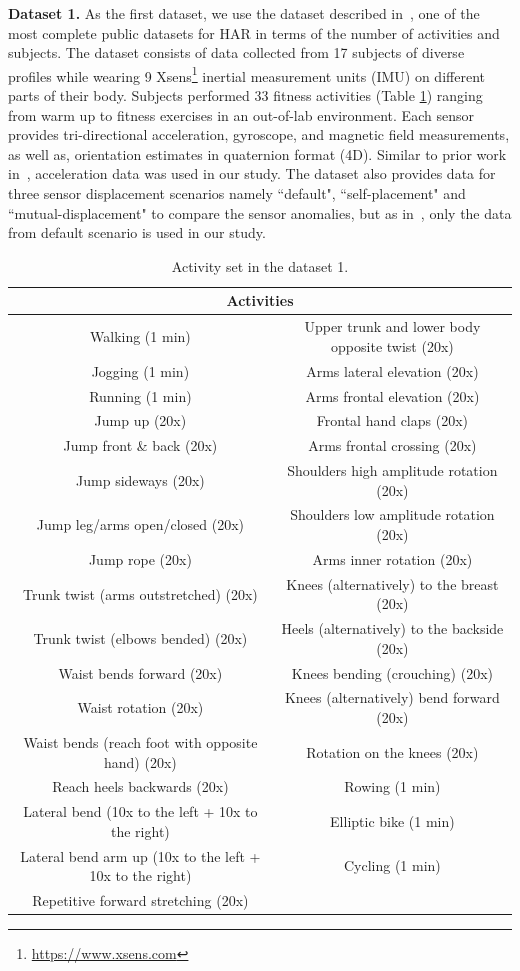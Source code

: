 \documentclass[sensors,article,submit,moreauthors,pdftex]{Definitions/mdpi}
\begin{document}
\noindent\textbf{Dataset 1.} \label{sec:dataset1}
 As the first dataset, we use the dataset described in~\cite{banos2012benchmark}, one of the most complete public datasets for HAR in terms of the number of activities and subjects. The dataset consists of data collected from 17 subjects of diverse profiles while wearing 9 Xsens\footnote{\url{https://www.xsens.com}} inertial measurement units (IMU) on different parts of their body. Subjects performed 33 fitness activities (Table \ref{tab:Activites1}) ranging from warm up to fitness exercises in an out-of-lab environment. Each sensor provides tri-directional acceleration, gyroscope, and magnetic field measurements, as well as, orientation estimates in quaternion format (4D). Similar to prior work in~\cite{banos2014window}, acceleration data was used in our study. The dataset also provides data for three sensor displacement scenarios namely ``default", ``self-placement" and ``mutual-displacement" to compare the sensor anomalies, but as in~\cite{banos2014window}, only the data from default scenario is used in our study. 

\begin{table}
  \centering
\begin{tabular}{|c|c|}
\hline 
\multicolumn{2}{|c|}{Activities}\tabularnewline
\hline 
\hline 
Walking (1 min) & Upper trunk and lower body opposite twist (20x)\tabularnewline
\hline 
Jogging (1 min) & Arms lateral elevation (20x)\tabularnewline
\hline 
Running (1 min) & Arms frontal elevation (20x)\tabularnewline
\hline 
Jump up (20x) & Frontal hand claps (20x)\tabularnewline
\hline 
Jump front \& back (20x) & Arms frontal crossing (20x)\tabularnewline
\hline 
Jump sideways (20x) & Shoulders high amplitude rotation (20x)\tabularnewline
\hline 
Jump leg/arms open/closed (20x) & Shoulders low amplitude rotation (20x)\tabularnewline
\hline 
Jump rope (20x) & Arms inner rotation (20x)\tabularnewline
\hline 
Trunk twist (arms outstretched) (20x) & Knees (alternatively) to the breast (20x)\tabularnewline
\hline 
Trunk twist (elbows bended) (20x) & Heels (alternatively) to the backside (20x)\tabularnewline
\hline 
Waist bends forward (20x) & Knees bending (crouching) (20x)\tabularnewline
\hline 
Waist rotation (20x) & Knees (alternatively) bend forward (20x)\tabularnewline
\hline 
Waist bends (reach foot with opposite hand) (20x) & Rotation on the knees (20x)\tabularnewline
\hline 
Reach heels backwards (20x) & Rowing (1 min)\tabularnewline
\hline 
Lateral bend (10x to the left + 10x to the right) & Elliptic bike (1 min)\tabularnewline
\hline 
Lateral bend arm up (10x to the left + 10x to the right) & Cycling (1 min)\tabularnewline
\hline 
Repetitive forward stretching (20x) & \tabularnewline
\hline 
\end{tabular}
        \caption{Activity set in the dataset 1.}        
        \label{tab:Activites1}
\end{table} 
\end{document}
